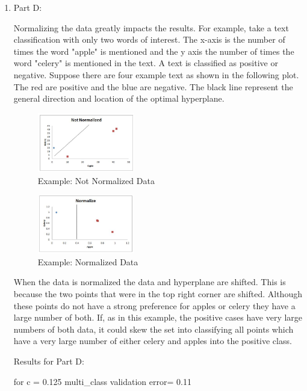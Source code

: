\documentclass[12pt]{article}
\begin{document}
\begin{enumerate}
\newpage

\item Part D:

Normalizing the data greatly impacts the results. For example, take a text classification with only two words of interest. The x-axis is the number of times the word "apple" is mentioned and the y axis the number of times the word "celery" is mentioned in the text. A text is classified as positive or negative. Suppose there are four example text as shown in the following plot. The red are positive and the blue are negative. The black line represent the general direction and location of the optimal hyperplane.

\begin{figure}[h!]
  \caption{Example: Not Normalized Data}
  \centering
    \includegraphics[width=0.4\textwidth]{notNormalized}
\end{figure}

\begin{figure}[h!]
  \caption{Example: Normalized Data}
  \centering
    \includegraphics[width=0.4\textwidth]{normalized}
\end{figure}


When the data is normalized the data and hyperplane are shifted. This is because the two points that were in the top right corner are shifted. Although these points do not have a strong preference for apples or celery they have a large number of both. If, as in this example, the positive cases have very large numbers of both data, it could skew the set into classifying all points which have a very large number of either celery and apples into the positive class.

Results for Part D:



for c = 0.125 multi\_class validation error= 0.11


\end{enumerate}
\end{document}
